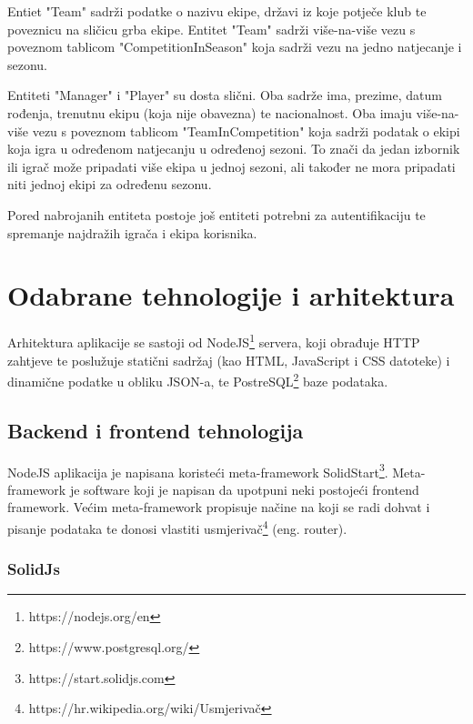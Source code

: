 \documentclass[times, utf8, zavrsni]{fer}
\begin{document}
Entiet "Team" sadrži podatke o nazivu ekipe, državi iz koje potječe klub te poveznicu na sličicu grba ekipe. Entitet "Team" sadrži više-na-više vezu s poveznom tablicom "CompetitionInSeason" koja sadrži vezu na jedno natjecanje i sezonu.

Entiteti "Manager" i "Player" su dosta slični. Oba sadrže ima, prezime, datum rođenja, trenutnu ekipu (koja nije obavezna) te nacionalnost. Oba imaju više-na-više vezu s poveznom tablicom "TeamInCompetition" koja sadrži podatak o ekipi koja igra u određenom natjecanju u određenoj sezoni.
To znači da jedan izbornik ili igrač može pripadati više ekipa u jednoj sezoni, ali također ne mora pripadati niti jednoj ekipi za određenu sezonu.

Pored nabrojanih entiteta postoje još entiteti potrebni za autentifikaciju te spremanje najdražih igrača i ekipa korisnika.

\chapter{Odabrane tehnologije i arhitektura}

Arhitektura aplikacije se sastoji od NodeJS\footnote{https://nodejs.org/en} servera, koji obrađuje HTTP zahtjeve te poslužuje statični sadržaj (kao HTML, JavaScript i CSS datoteke) i dinamične podatke u obliku JSON-a, te PostreSQL\footnote{https://www.postgresql.org/} baze podataka.

\section{Backend i frontend tehnologija}
NodeJS aplikacija je napisana koristeći meta-framework SolidStart\footnote{https://start.solidjs.com}. Meta-framework \citep{meta2022davanzo} je software koji je napisan da upotpuni neki postojeći frontend framework.
Većim meta-framework propisuje načine na koji se radi dohvat i pisanje podataka te donosi vlastiti usmjerivač\footnote{https://hr.wikipedia.org/wiki/Usmjerivač} (eng. router).

\subsection{SolidJs}
\end{document}
